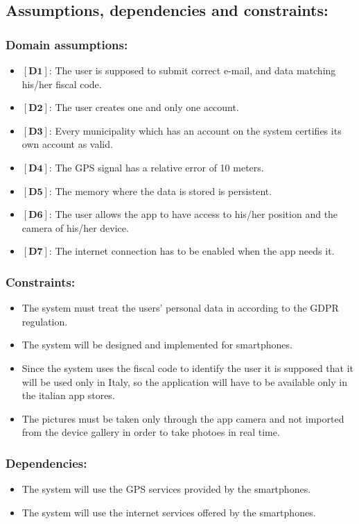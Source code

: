 \documentclass[titlepage]{article}
\begin{document}
\subsection{Assumptions, dependencies and constraints: }
\subsubsection{Domain assumptions: }
\begin{itemize}
	\item $[\textbf{D1}]$: The user is supposed to submit correct e-mail, and data matching his/her fiscal code.
	\item $[\textbf{D2}]$: The user creates one and only one account.
	\item $[\textbf{D3}]$: Every municipality which has an account on the system certifies its own account as valid.
	\item $[\textbf{D4}]$: The GPS signal has a relative error of 10 meters.
	\item $[\textbf{D5}]$: The memory where the data is stored is persistent.
	\item$[\textbf{D6}]$: The user allows the app to have access to his/her position and the camera of his/her device.
	\item $[\textbf{D7}]$: The internet connection has to be enabled when the app needs it.
	
\end{itemize}
\subsubsection{Constraints: }
\begin{itemize}
	\item  The system must treat the users' personal data in according to the GDPR regulation.
	\item The system will be designed and implemented for smartphones.
	\item Since the system uses the fiscal code to identify the user it is supposed that it will be used only in Italy, so the application will have to be available only in the italian app stores.
	\item The pictures must be taken only through the app camera and not imported from the device gallery in order to take photoes in real time.
\end{itemize}

\subsubsection{Dependencies: }
\begin{itemize}
	\item The system will use the GPS services provided by the smartphones.
	\item The system will use the internet services offered by the smartphones.
\end{itemize}
\end{document}

